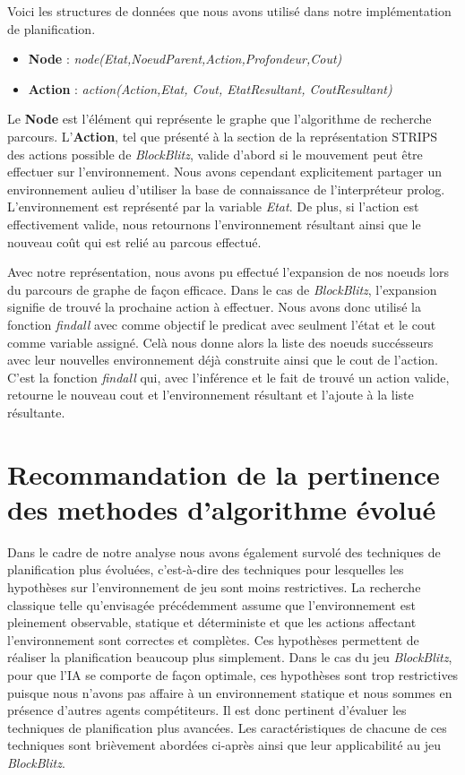 \documentclass[12pt,english,frenchb,letterpaper]{article}
\begin{document}
Voici les structures de données que nous avons utilisé dans notre implémentation de planification.

\begin{itemize}
\item \textbf{Node} : \textit{node(Etat,NoeudParent,Action,Profondeur,Cout)}
\item \textbf{Action} : \textit{action(Action,Etat, Cout, EtatResultant, CoutResultant)}
\end{itemize}

Le \textbf{Node} est l'élément qui représente le graphe que l'algorithme de recherche parcours. L'\textbf{Action}, tel que présenté à la section de la représentation STRIPS des actions possible de \textit{BlockBlitz}, valide d'abord si le mouvement peut être effectuer sur l'environnement. Nous avons cependant explicitement partager un environnement aulieu d'utiliser la base de connaissance de l'interpréteur prolog. L'environnement est représenté par la variable \textit{Etat}. De plus, si l'action est effectivement valide, nous retournons l'environnement résultant ainsi que le nouveau coût qui est relié au parcous effectué.

Avec notre représentation, nous avons pu effectué l'expansion de nos noeuds lors du parcours de graphe de façon efficace. Dans le cas de \textit{BlockBlitz}, l'expansion signifie de trouvé la prochaine action à effectuer. Nous avons donc utilisé la fonction \textit{findall} avec comme objectif le predicat avec seulment l'état et le cout comme variable assigné. Celà nous donne alors la liste des noeuds succésseurs avec leur nouvelles environnement déjà construite ainsi que le cout de l'action. C'est la fonction \textit{findall} qui, avec l'inférence et le fait de trouvé un action valide, retourne le nouveau cout et l'environnement résultant et l'ajoute à la liste résultante.


\section{Recommandation de la pertinence des methodes d'algorithme évolué}

Dans le cadre de notre analyse nous avons également survolé des techniques de planification plus évoluées, c'est-à-dire des techniques pour lesquelles les hypothèses sur l'environnement de jeu sont moins restrictives.  La recherche classique telle qu'envisagée précédemment assume que l'environnement est pleinement observable, statique et déterministe et que les actions affectant l'environnement sont correctes et complètes. Ces hypothèses permettent de réaliser la planification beaucoup plus simplement.
Dans le cas du jeu \textit{BlockBlitz}, pour que l'IA se comporte de fa\c con optimale, ces hypothèses sont trop restrictives puisque nous n'avons pas affaire à un environnement statique et nous sommes en présence d'autres agents compétiteurs.  Il est donc pertinent d'évaluer les techniques de planification plus avancées.  Les caractéristiques de chacune de ces techniques sont brièvement abordées ci-après ainsi que leur applicabilité au jeu \textit{BlockBlitz}.
\end{document}
